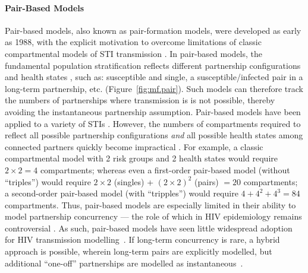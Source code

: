 \paragraph{Pair-Based Models}
Pair-based models, also known as pair-formation models, were developed as early as 1988,
with the explicit motivation to overcome limitations of
classic compartmental models of STI transmission \cite{Dietz1988sti}.
In pair-based models, the fundamental population stratification
reflects different partnership configurations and health states \cite{Kretzschmar2017}, such as:
susceptible and single, a susceptible/infected pair in a long-term partnership, etc.
(Figure~\ref{fig:mf.pair}).
Such models can therefore track the numbers of partnerships
where transmission is \vs is not possible,
thereby avoiding the instantaneous partnership assumption.
Pair-based models have been applied to a variety of STIs \cite{Kretzschmar2017}.
However, the numbers of compartments required to reflect all possible partnership configurations
\emph{and} all possible health states among connected partners
quickly become impractical \cite{Kretzschmar2017,Rao2021}.
For example, a classic compartmental model with 2 risk groups and 2 health states
would require $2\times2=4$ compartments;
whereas even a first-order pair-based model (\ie without ``triples'')
would require $2\times2$ (singles) + ${(2\times2)}^2$ (pairs) ${} = 20$ compartments;
a second-order pair-based model (\ie with ``tripples'')
would require $4 + 4^2 + 4^3 = 84$ compartments.
Thus, pair-based models are especially limited in their ability to model partnership concurrency
--- the role of which in HIV epidemiology remains controversial \cite{Sawers2013}.
As such, pair-based models have seen little widespread adoption
for HIV transmission modelling~\cite{Rao2021}.
If long-term concurrency is rare, a hybrid approach is possible,
wherein long-term pairs are explicitly modelled,
but additional ``one-off'' partnerships are modelled as instantaneous~\cite{Xiridou2003,Powers2011ahi}.
